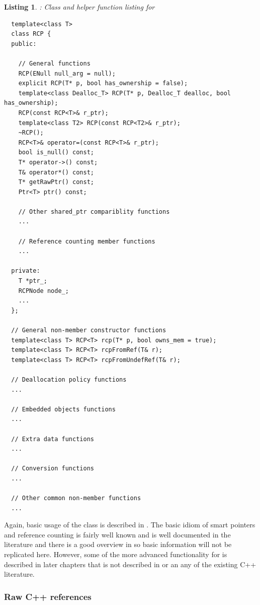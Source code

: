 \documentclass[pdf,ps2pdf,11pt]{SANDreport}
\newtheorem{listing}{Listing}
\begin{document}
\begin{listing}: Class and helper function listing for {} \\
\label{listing:RCP}
{\small\begin{verbatim}
  template<class T>
  class RCP {
  public:

    // General functions
    RCP(ENull null_arg = null);
    explicit RCP(T* p, bool has_ownership = false);
    template<class Dealloc_T> RCP(T* p, Dealloc_T dealloc, bool has_ownership);
    RCP(const RCP<T>& r_ptr);
    template<class T2> RCP(const RCP<T2>& r_ptr);
    ~RCP();
    RCP<T>& operator=(const RCP<T>& r_ptr);
    bool is_null() const;
    T* operator->() const;
    T& operator*() const;
    T* getRawPtr() const;
    Ptr<T> ptr() const;
  
    // Other shared_ptr compariblity functions
    ...
  
    // Reference counting member functions
    ...
  
  private:
    T *ptr_;
    RCPNode node_;
    ...
  };

  // General non-member constructor functions
  template<class T> RCP<T> rcp(T* p, bool owns_mem = true);
  template<class T> RCP<T> rcpFromRef(T& r);
  template<class T> RCP<T> rcpFromUndefRef(T& r);

  // Deallocation policy functions
  ...

  // Embedded objects functions
  ...

  // Extra data functions
  ...
 
  // Conversion functions
  ...

  // Other common non-member functions
  ...

\end{verbatim}}
\end{listing}

Again, basic usage of the {} class is described in
{}\cite{RefCountPtrBeginnersGuide}.  The basic idiom of smart pointers and
reference counting is fairly well known and is well documented in the
literature and there is a good overview in {}\cite{RefCountPtrBeginnersGuide}
so basic information will not be replicated here.  However, some of the more
advanced functionality for {} is described in later chapters that
is not described in {}\cite{RefCountPtrBeginnersGuide} or an any of the
existing C++ literature.


%
{}\subsubsection{Raw C++ references}
\label{sec:raw-C++-references}
%
\end{document}

